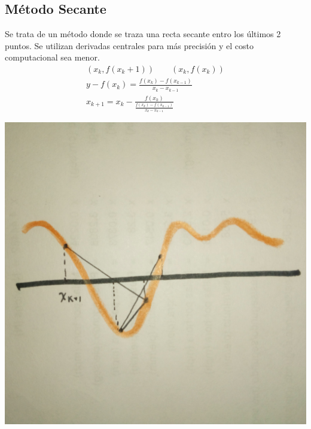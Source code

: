\subsection{M\'etodo Secante}
Se trata de un m\'etodo donde se traza una recta secante entro los \'ultimos 2 puntos. Se utilizan derivadas centrales para m\'as precisi\'on y el costo computacional sea menor.
\begin{gather}
\nonumber(x_k,f(x_k+1)) \qquad (x_k,f(x_k))\\
y-f(x_k)=\frac{f(x_k)-f(x_{k-1})}{x_k-x_{k-1}}\\
\boxed{x_{k+1}=x_k-\frac{f(x_k)}{\frac{f(x_k)-f(x_{k-1})}{x_k-x_{k-1}}}}
\end{gather}
\begin{center}
\includegraphics[scale=.05]{imagenes/4.jpg}
\end{center}
